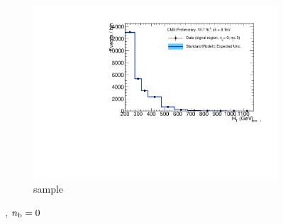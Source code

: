 \begin{figure}[h!]
\begin{subfigure}[b]{0.48\textwidth}
    \includegraphics[width=\textwidth,page=6]
    {Figs/results/v0/blueBand/bestFit_2012dev_RQcdZero_fZinvAll_0b_le3j-12hp_smOnly}
    \caption{\gj sample}
  \end{subfigure}
  \caption{\njlow, $n_{\text{b}} = 0$}
  \label{fig:blue_fits_0b_le3j}
\end{figure}

